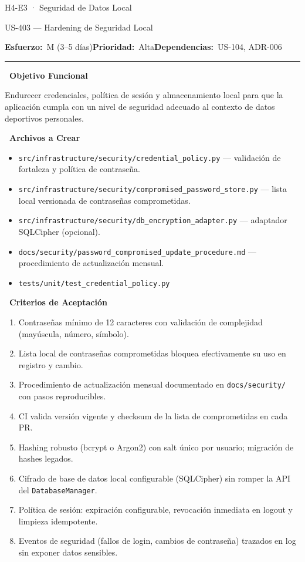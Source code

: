 \documentclass[11pt,a4paper]{article}
\newcommand{\fpath}[1]{\texttt{\small #1}}
\newcommand{\usfield}[2][\;]{%
  \par\vspace{5pt}%
  {\small\textbf{\textcolor{primary}{#2}}}\par\vspace{2pt}%
}
\newcommand{\usmeta}[3]{%
  \vspace{2pt}%
  {\small\textcolor{secondary}{%
    \textbf{Esfuerzo:}~#1\quad\textbf{Prioridad:}~#2\quad\textbf{Dependencias:}~#3%
  }}%
  \par\vspace{4pt}%
  \textcolor{bordergray}{\rule{\linewidth}{0.4pt}}\par\vspace{4pt}%
}
\begin{document}
\begin{epicbox}{H4-E3 · Seguridad de Datos Local}
\end{epicbox}

\begin{uscard}{US-403 — Hardening de Seguridad Local}

\usmeta{M (3–5 días)}{Alta}{US-104, ADR-006}

\usfield{\faAlignLeft\ Objetivo Funcional}
Endurecer credenciales, política de sesión y almacenamiento local para que la aplicación cumpla con un nivel de seguridad adecuado al contexto de datos deportivos personales.

\usfield{\faFolderOpen\ Archivos a Crear}
\begin{itemize}[nosep, leftmargin=1.6em]
  \item \fpath{src/infrastructure/security/credential\_policy.py} — validación de fortaleza y política de contraseña.
  \item \fpath{src/infrastructure/security/compromised\_password\_store.py} — lista local versionada de contraseñas comprometidas.
  \item \fpath{src/infrastructure/security/db\_encryption\_adapter.py} — adaptador SQLCipher (opcional).
  \item \fpath{docs/security/password\_compromised\_update\_procedure.md} — procedimiento de actualización mensual.
  \item \fpath{tests/unit/test\_credential\_policy.py}
\end{itemize}

\usfield{\faCheckCircle\ Criterios de Aceptación}
\begin{enumerate}[label=\textcolor{accent}{\textbf{AC\arabic*.}}, nosep, leftmargin=2.2em]
  \item Contraseñas mínimo de 12 caracteres con validación de complejidad (mayúscula, número, símbolo).
  \item Lista local de contraseñas comprometidas bloquea efectivamente su uso en registro y cambio.
  \item Procedimiento de actualización mensual documentado en \fpath{docs/security/} con pasos reproducibles.
  \item CI valida versión vigente y checksum de la lista de comprometidas en cada PR.
  \item Hashing robusto (bcrypt o Argon2) con salt único por usuario; migración de hashes legados.
  \item Cifrado de base de datos local configurable (SQLCipher) sin romper la API del \fpath{DatabaseManager}.
  \item Política de sesión: expiración configurable, revocación inmediata en logout y limpieza idempotente.
  \item Eventos de seguridad (fallos de login, cambios de contraseña) trazados en log sin exponer datos sensibles.
\end{enumerate}


\end{uscard}
\end{document}
